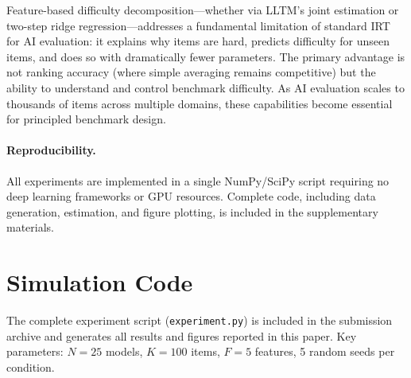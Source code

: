 \documentclass[11pt,a4paper]{article}
\begin{document}
Feature-based difficulty decomposition---whether via LLTM's joint
estimation or two-step ridge regression---addresses a fundamental
limitation of standard IRT for AI evaluation: it explains why items
are hard, predicts difficulty for unseen items, and does so with
dramatically fewer parameters. The primary advantage is not ranking
accuracy (where simple averaging remains competitive) but the ability
to understand and control benchmark difficulty. As AI evaluation scales
to thousands of items across multiple domains, these capabilities become
essential for principled benchmark design.

\paragraph{Reproducibility.}
All experiments are implemented in a single NumPy/SciPy script
requiring no deep learning frameworks or GPU resources.
Complete code, including data generation, estimation, and
figure plotting, is included in the supplementary materials.




\appendix
\section{Simulation Code}
\label{app:code}
The complete experiment script (\texttt{experiment.py}) is included in
the submission archive and generates all results and figures reported
in this paper. Key parameters: $N = 25$ models, $K = 100$ items,
$F = 5$ features, 5 random seeds per condition.
\end{document}
